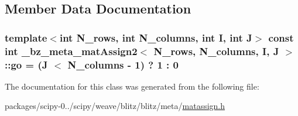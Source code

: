 \subsection{Member Data Documentation}
\hypertarget{class__bz__meta__matAssign2_a072cdc4e57d467d15d3164c3b0ae01f7}{}
\subsubsection[{go}]{\setlength{\rightskip}{0pt plus 5cm}template$<$int N\+\_\+rows, int N\+\_\+columns, int I, int J$>$ const int {\bf \+\_\+bz\+\_\+meta\+\_\+mat\+Assign2}$<$ N\+\_\+rows, N\+\_\+columns, I, J $>$\+::go = (J $<$ N\+\_\+columns -\/ 1) ? 1 \+: 0\hspace{0.3cm}{\ttfamily [static]}}\label{class__bz__meta__matAssign2_a072cdc4e57d467d15d3164c3b0ae01f7}


The documentation for this class was generated from the following file\+:\begin{DoxyCompactItemize}
\item 
packages/scipy-\/0../scipy/weave/blitz/blitz/meta/\hyperlink{matassign_8h}{matassign.\+h}\end{DoxyCompactItemize}
